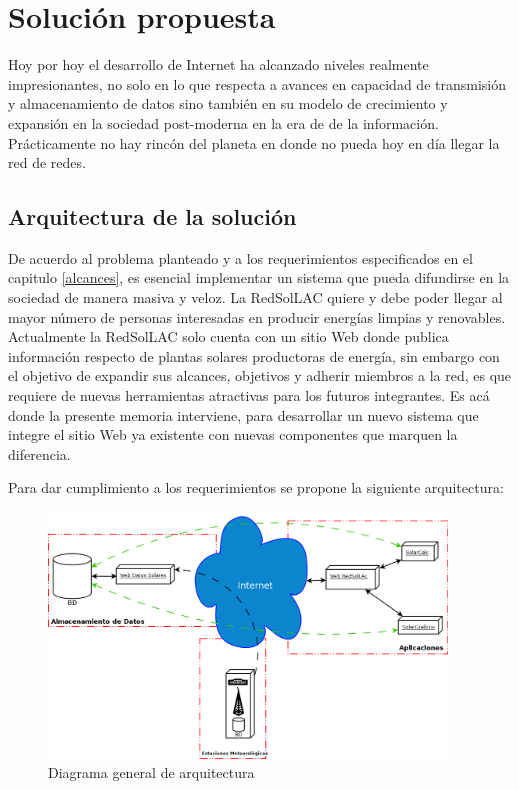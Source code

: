 \chapter{Solución propuesta}
\label{solucion}
Hoy por hoy el desarrollo de Internet ha alcanzado niveles realmente impresionantes, no solo en lo que respecta a avances en capacidad de transmisión y almacenamiento de datos sino también en su modelo de crecimiento y expansión en la sociedad post-moderna en la era de de la información. Prácticamente no hay rincón del planeta en donde no pueda hoy en día llegar la red de redes.\\

\section{Arquitectura de la solución}
\label{arquitectura}
De acuerdo al problema planteado y a los requerimientos especificados en el capitulo \ref{alcances}, es esencial implementar un sistema que pueda difundirse en la sociedad de manera masiva y veloz. La RedSolLAC quiere y debe poder llegar al mayor número de personas interesadas en producir energías limpias y renovables.\\

Actualmente la RedSolLAC solo cuenta con un sitio Web donde publica información respecto de plantas solares productoras de energía, sin embargo con el objetivo de expandir sus alcances, objetivos y adherir miembros a la red, es que requiere de nuevas herramientas atractivas para los futuros integrantes. Es acá donde la presente memoria interviene, para desarrollar un nuevo sistema que integre el sitio Web ya existente con nuevas componentes que marquen la diferencia.

Para dar cumplimiento a los requerimientos se propone la siguiente arquitectura:

\begin{figure}[h!]
        \centering
        \includegraphics[width=300pt]{images/diagramaArquitectura}
        \caption{Diagrama general de arquitectura}
	\label{da}
\end{figure}

